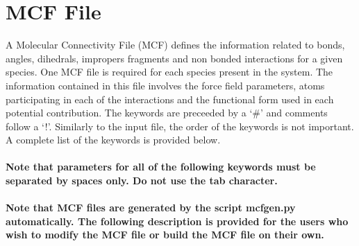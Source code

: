 %     
%
%
%
%
%
\section{MCF File}\label{sec:MCF_File}
%
A Molecular Connectivity File (MCF) defines the information related to bonds, angles, dihedrals, impropers
fragments and non bonded interactions for a given species. One MCF file is required for each species present in
the system. The information contained in this file involves the force field parameters, atoms
participating in each of the interactions and the functional form used in each potential contribution.
The keywords are preceeded by a `\#' and comments follow a `!'. Similarly to the input file, the order
of the keywords is not important. A complete list of the keywords is provided below. \\ \\
%
{\bf Note that parameters for all of the following keywords must be separated by spaces only. 
Do not use the tab character. \\ \\
%
Note that MCF files are generated by the script mcfgen.py automatically. The following description is provided for
the users who wish to modify the MCF file or build the MCF file on their own.} \\ \\ 

